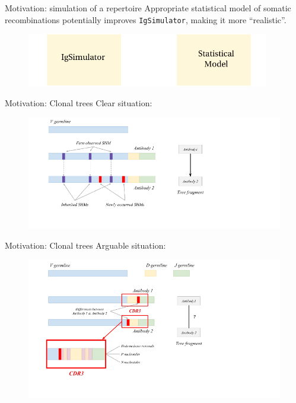 \documentclass{beamer}\usepackage[]{graphicx}\usepackage[]{color}
\begin{document}
\begin{frame}{Motivation: simulation of a repertoire}
  Appropriate statistical model of somatic recombinations potentially improves \texttt{IgSimulator}, making it more ``realistic''.
  
  \begin{figure}[h]
    \center\includegraphics[width=300pt]{Pictures/igsimulator.pdf}
  \end{figure}
\end{frame}

\begin{frame}{Motivation: Clonal trees}
  Clear situation:
  \begin{figure}[h]
    \includegraphics[width=400pt]{Pictures/clonal_trees1.pdf}
  \end{figure}
\end{frame}

\begin{frame}{Motivation: Clonal trees}
  Arguable situation:
  \begin{figure}[h]
    \includegraphics[width=400pt]{Pictures/clonal_trees2.pdf}
  \end{figure}
\end{frame}
\end{document}
